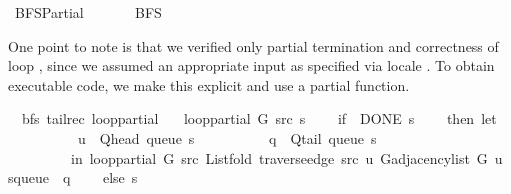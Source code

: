 %
\begin{isabellebody}%
%
%
\isadelimdocument
%
\endisadelimdocument
%
\isatagdocument
%
\isamarkuptrue%
%
\endisatagdocument
{\isafolddocument}%
%
\isadelimdocument
%
\endisadelimdocument
%
\isadelimtheory
%
\endisadelimtheory
%
\isatagtheory
{}\isamarkupfalse%
\ BFS{\isacharunderscore}{\kern0pt}Partial\isanewline
\ \ \isanewline
\ \ \ \ BFS\isanewline
{}%
\endisatagtheory
{\isafoldtheory}%
%
\isadelimtheory
%
\endisadelimtheory
%
\begin{isamarkuptext}%
One point to note is that we verified only partial termination and correctness of loop
, since we assumed an appropriate input as specified via locale
. To obtain executable code, we make this explicit and use a partial
function.%
\end{isamarkuptext}\isamarkuptrue%
\isamarkupfalse%
\ {\isacharparenleft}{\kern0pt}\ bfs{\isacharparenright}{\kern0pt}\ {\isacharparenleft}{\kern0pt}tailrec{\isacharparenright}{\kern0pt}\ loop{\isacharunderscore}{\kern0pt}partial\ \isanewline
\ \ {\isachardoublequoteopen}loop{\isacharunderscore}{\kern0pt}partial\ G\ src\ s\ {\isacharequal}{\kern0pt}\isanewline
\ \ \ {\isacharparenleft}{\kern0pt}if\ {\isasymnot}\ DONE\ s\isanewline
\ \ \ \ then\ let\isanewline
\ \ \ \ \ \ \ \ \ \ u\ {\isacharequal}{\kern0pt}\ Q{\isacharunderscore}{\kern0pt}head\ {\isacharparenleft}{\kern0pt}queue\ s{\isacharparenright}{\kern0pt}{\isacharsemicolon}{\kern0pt}\isanewline
\ \ \ \ \ \ \ \ \ \ q\ {\isacharequal}{\kern0pt}\ Q{\isacharunderscore}{\kern0pt}tail\ {\isacharparenleft}{\kern0pt}queue\ s{\isacharparenright}{\kern0pt}\isanewline
\ \ \ \ \ \ \ \ \ in\ loop{\isacharunderscore}{\kern0pt}partial\ G\ src\ {\isacharparenleft}{\kern0pt}List{\isachardot}{\kern0pt}fold\ {\isacharparenleft}{\kern0pt}traverse{\isacharunderscore}{\kern0pt}edge\ src\ u{\isacharparenright}{\kern0pt}\ {\isacharparenleft}{\kern0pt}G{\isachardot}{\kern0pt}adjacency{\isacharunderscore}{\kern0pt}list\ G\ u{\isacharparenright}{\kern0pt}\ {\isacharparenleft}{\kern0pt}s{\isasymlparr}queue\ {\isacharcolon}{\kern0pt}{\isacharequal}{\kern0pt}\ q{\isasymrparr}{\isacharparenright}{\kern0pt}{\isacharparenright}{\kern0pt}\isanewline
\ \ \ \ else\ s{\isacharparenright}{\kern0pt}{\isachardoublequoteclose}\isanewline

\end{isabellebody}

